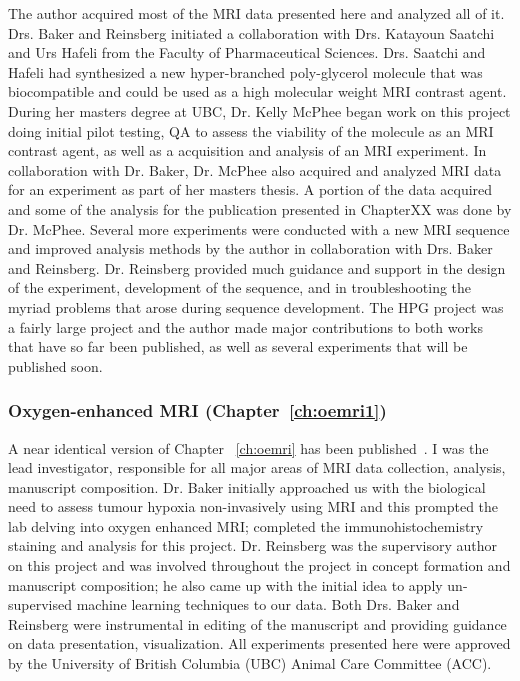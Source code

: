 The author acquired most of the MRI data presented here and analyzed all of it.
Drs. Baker and Reinsberg initiated a collaboration with Drs. Katayoun Saatchi and Urs Hafeli from the Faculty of Pharmaceutical Sciences.
Drs. Saatchi and Hafeli had synthesized a new hyper-branched poly-glycerol molecule that was biocompatible and could be used as a high molecular weight MRI contrast agent.
During her masters degree at UBC, Dr. Kelly McPhee began work on this project doing initial pilot testing, QA to assess the viability of the molecule as an MRI contrast agent, as well as a acquisition and analysis of an MRI experiment.
In collaboration with Dr. Baker, Dr. McPhee also acquired and analyzed MRI data for an experiment as part of her masters thesis. 
A portion of the data acquired and some of the analysis for the publication presented in ChapterXX was done by Dr. McPhee.
Several more experiments were conducted with a new MRI sequence and improved analysis methods by the author in collaboration with Drs. Baker and Reinsberg. 
Dr.  Reinsberg provided much guidance and support in the design of the experiment, development of the sequence, and in troubleshooting the myriad problems that arose during sequence development.
The HPG project was a fairly large project and the author made major contributions to both works that have so far been published, as well as several experiments that will be published soon.

\subsubsection{Oxygen-enhanced MRI (Chapter~\ref{ch:oemri1})}

A near identical version of Chapter ~\ref{ch:oemri} has been published~\cite{Moosvi:2018ca}. 
I was the lead investigator, responsible for all major areas of MRI data collection, analysis, manuscript composition. 
Dr. Baker initially approached us with the biological need to assess tumour hypoxia non-invasively using MRI and this prompted the lab delving into oxygen enhanced MRI; completed the immunohistochemistry staining and analysis for this project.
Dr. Reinsberg was the supervisory author on this project and was involved throughout the project in concept formation and manuscript composition; he also came up with the initial idea to apply un-supervised machine learning techniques to our data. 
Both Drs. Baker and Reinsberg were instrumental in editing of the manuscript and providing guidance on data presentation, visualization.
All experiments presented here were approved by the University of British Columbia (UBC) Animal Care Committee (ACC).


